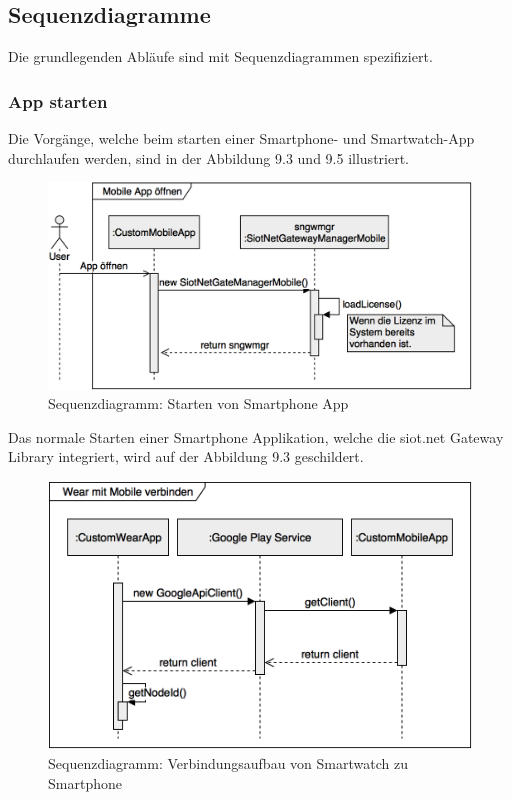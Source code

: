 \subsection{Sequenzdiagramme}
Die grundlegenden Abläufe sind mit Sequenzdiagrammen spezifiziert.
\subsubsection{App starten}
Die Vorgänge, welche beim starten einer Smartphone- und Smartwatch-App durchlaufen werden, sind in der Abbildung 9.3 und 9.5 illustriert.
\begin{figure}[H]
  \centering
  \includegraphics[scale=0.28]{98_Bilder/09_Konzept/01_SequenzdiagrammOpenAppSiotNetGatewayLibrary}
  \caption[siot.net Gateway Library Sequenzdiagramm App starten 1]{Sequenzdiagramm: Starten von Smartphone App}
\end{figure}
Das normale Starten einer Smartphone Applikation, welche die siot.net Gateway Library integriert, wird auf der Abbildung 9.3 geschildert.
\begin{figure}[H]
  \centering
  \includegraphics[scale=0.28]{98_Bilder/09_Konzept/02_SequenzdiagrammOpenAppSiotNetGatewayLibrary}
  \caption[siot.net Gateway Library Sequenzdiagramm App starten 2]{Sequenzdiagramm: Verbindungsaufbau von Smartwatch zu Smartphone}
\end{figure}
